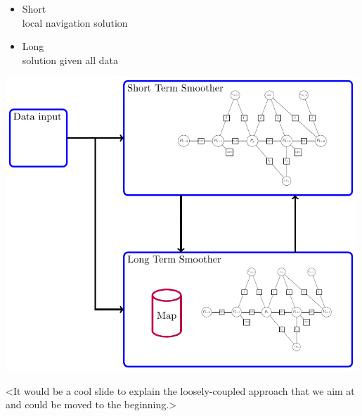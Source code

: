 \documentclass[%
    fourtothree=true, %
    DepLogo=true     %
    ]{ETHpres}
\begin{document}
\begin{minipage}{0.4\textwidth}
	\begin{itemize}
		\item[\ETHitem] \normalsize Short\\ \footnotesize local navigation solution
		\vspace*{3\baselineskip}
		\item[\ETHitem] \normalsize Long\\ \footnotesize solution given all data
\end{itemize}
\end{minipage}
\begin{minipage}{0.59\textwidth}
	\centering
	\includegraphics[width=0.99\textwidth]{TikZ_drawings/Simple_STS_and_LTS_diagram_2/Simple_STS_and_LTS_2.pdf}\\
\end{minipage}

\tiny <It would be a cool slide to explain the loosely-coupled approach that we aim at and could be moved to the beginning.>
\normalsize


\clearpage

\ETHslide
\end{document}
